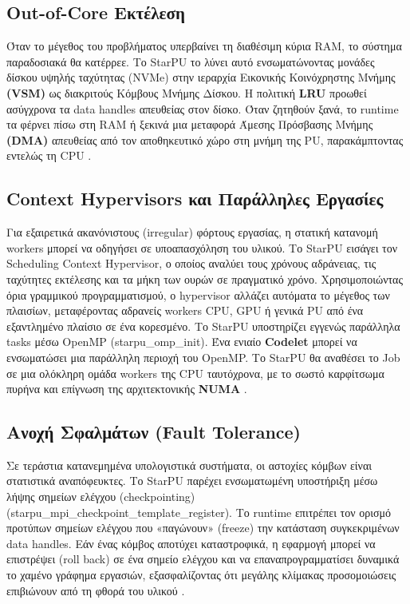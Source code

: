 \subsection{Out-of-Core Εκτέλεση}

Όταν το μέγεθος του προβλήματος υπερβαίνει τη διαθέσιμη κύρια RAM, το σύστημα παραδοσιακά θα κατέρρεε. Το StarPU το λύνει αυτό ενσωματώνοντας μονάδες δίσκου υψηλής ταχύτητας (NVMe) στην ιεραρχία Εικονικής Κοινόχρηστης Μνήμης \textbf{(VSM)} ως διακριτούς Κόμβους Μνήμης Δίσκου. Η πολιτική \textbf{LRU} προωθεί ασύγχρονα τα data handles απευθείας στον δίσκο. Όταν ζητηθούν ξανά, το runtime τα φέρνει πίσω στη RAM ή ξεκινά μια μεταφορά Άμεσης Πρόσβασης Μνήμης \textbf{(DMA)} απευθείας από τον αποθηκευτικό χώρο στη μνήμη της PU, παρακάμπτοντας εντελώς τη CPU \cite{starpu2025handbook}.

\subsection{Context Hypervisors και Παράλληλες Εργασίες}

Για εξαιρετικά ακανόνιστους (irregular) φόρτους εργασίας, η στατική κατανομή workers μπορεί να οδηγήσει σε υποαπασχόληση του υλικού. Το StarPU εισάγει τον Scheduling Context Hypervisor, ο οποίος αναλύει τους χρόνους αδράνειας, τις ταχύτητες εκτέλεσης και τα μήκη των ουρών σε πραγματικό χρόνο. Χρησιμοποιώντας όρια γραμμικού προγραμματισμού, ο hypervisor αλλάζει αυτόματα το μέγεθος των πλαισίων, μεταφέροντας αδρανείς workers CPU, GPU ή γενικά PU από ένα εξαντλημένο πλαίσιο σε ένα κορεσμένο. Το StarPU υποστηρίζει εγγενώς παράλληλα tasks μέσω OpenMP (starpu\_omp\_init). Ένα ενιαίο \textbf{Codelet} μπορεί να ενσωματώσει μια παράλληλη περιοχή του OpenMP. Το StarPU θα αναθέσει το Job σε μια ολόκληρη ομάδα workers της CPU ταυτόχρονα, με το σωστό καρφίτσωμα πυρήνα και επίγνωση της αρχιτεκτονικής \textbf{NUMA} \cite{starpu2025handbook}.

\subsection{Ανοχή Σφαλμάτων (Fault Tolerance)}

Σε τεράστια κατανεμημένα υπολογιστικά συστήματα, οι αστοχίες κόμβων είναι στατιστικά αναπόφευκτες. Το StarPU παρέχει ενσωματωμένη υποστήριξη μέσω λήψης σημείων ελέγχου (checkpointing) (starpu\_mpi\_checkpoint\_template\_register). Το runtime επιτρέπει τον ορισμό προτύπων σημείων ελέγχου που «παγώνουν» (freeze) την κατάσταση συγκεκριμένων data handles. Εάν ένας κόμβος αποτύχει καταστροφικά, η εφαρμογή μπορεί να επιστρέψει (roll back) σε ένα σημείο ελέγχου και να επαναπρογραμματίσει δυναμικά το χαμένο γράφημα εργασιών, εξασφαλίζοντας ότι μεγάλης κλίμακας προσομοιώσεις επιβιώνουν από τη φθορά του υλικού \cite{starpu2025handbook}.